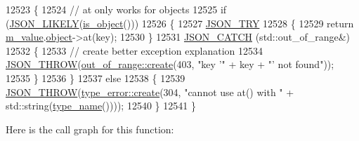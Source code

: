 \begin{DoxyCode}
12523     \{
12524         \textcolor{comment}{// at only works for objects}
12525         \textcolor{keywordflow}{if} (\hyperlink{json_8hpp_a41ecd1c4cf7c3d56477b9b685b5daa72}{JSON\_LIKELY}(\hyperlink{classnlohmann_1_1basic__json_af8f511af124e82e4579f444b4175787c}{is\_object}()))
12526         \{
12527             \hyperlink{json_8hpp_a985d3b82445302c57257f6432f261fe9}{JSON\_TRY}
12528             \{
12529                 \textcolor{keywordflow}{return} \hyperlink{classnlohmann_1_1basic__json_aeb0814f76966f99290cb29e127c90a77}{m\_value}.\hyperlink{unionnlohmann_1_1basic__json_1_1json__value_a4a2209bb26e7088cd36bf24824ab5521}{object}->at(key);
12530             \}
12531             \hyperlink{json_8hpp_a6954bec49ed2a2dfb938c1131c82740a}{JSON\_CATCH} (std::out\_of\_range&)
12532             \{
12533                 \textcolor{comment}{// create better exception explanation}
12534                 \hyperlink{json_8hpp_a6c274f6db2e65c1b66c7d41b06ad690f}{JSON\_THROW}(\hyperlink{classnlohmann_1_1detail_1_1out__of__range_a3f6d82a6f967c4728a1ec735a7867073}{out\_of\_range::create}(403, \textcolor{stringliteral}{"key '"} + key + \textcolor{stringliteral}{"' not
       found"}));
12535             \}
12536         \}
12537         \textcolor{keywordflow}{else}
12538         \{
12539             \hyperlink{json_8hpp_a6c274f6db2e65c1b66c7d41b06ad690f}{JSON\_THROW}(\hyperlink{classnlohmann_1_1detail_1_1type__error_aecc083aea4b698c33d042670ba50c10f}{type\_error::create}(304, \textcolor{stringliteral}{"cannot use at() with "} + 
      std::string(\hyperlink{classnlohmann_1_1basic__json_a9d0a478571f82f0163b96b2424cd998f}{type\_name}())));
12540         \}
12541     \}
\end{DoxyCode}
Here is the call graph for this function\+:
\mbox{\label{classnlohmann_1_1basic__json_a8ab61397c10f18b305520da7073b2b45}} 
